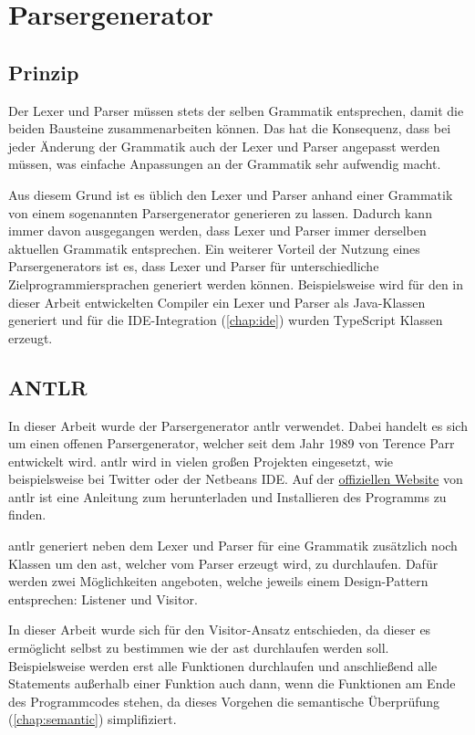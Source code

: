 \section{Parsergenerator}
\subsection{Prinzip}
Der Lexer und Parser müssen stets der selben Grammatik entsprechen, damit die beiden Bausteine zusammenarbeiten können. Das hat die Konsequenz, dass bei jeder Änderung der Grammatik auch der Lexer und Parser angepasst werden müssen, was einfache Anpassungen an der Grammatik sehr aufwendig macht.

Aus diesem Grund ist es üblich den Lexer und Parser anhand einer Grammatik von einem sogenannten Parsergenerator generieren zu lassen. Dadurch kann immer davon ausgegangen werden, dass Lexer und Parser immer derselben aktuellen Grammatik entsprechen. Ein weiterer Vorteil der Nutzung eines Parsergenerators ist es, dass Lexer und Parser für unterschiedliche Zielprogrammiersprachen generiert werden können. Beispielsweise wird für den in dieser Arbeit entwickelten Compiler ein Lexer und Parser als Java-Klassen generiert und für die IDE-Integration (\cref{chap:ide})  wurden TypeScript Klassen erzeugt.  

\subsection{ANTLR}
In dieser Arbeit wurde der Parsergenerator \ac{antlr} verwendet. Dabei handelt es sich um einen offenen Parsergenerator, welcher seit dem Jahr 1989 von Terence Parr entwickelt wird. \ac{antlr} wird in vielen großen Projekten eingesetzt, wie beispielsweise bei Twitter oder der Netbeans IDE. \cite{TerenceParr2022} Auf der \href{}{offiziellen Website} von \ac{antlr} ist eine Anleitung zum herunterladen und Installieren des Programms zu finden. 

\ac{antlr} generiert neben dem Lexer und Parser für eine Grammatik zusätzlich noch Klassen um den \ac{ast}, welcher vom Parser erzeugt wird, zu durchlaufen. Dafür werden zwei Möglichkeiten angeboten, welche jeweils einem Design-Pattern entsprechen: Listener und Visitor.

In dieser Arbeit wurde sich für den Visitor-Ansatz entschieden, da dieser es ermöglicht selbst zu bestimmen wie der \ac{ast} durchlaufen werden soll. Beispielsweise werden erst alle Funktionen durchlaufen und anschließend alle Statements außerhalb einer Funktion auch dann, wenn die Funktionen am Ende des Programmcodes stehen, da dieses Vorgehen die semantische Überprüfung (\cref{chap:semantic}) simplifiziert.

